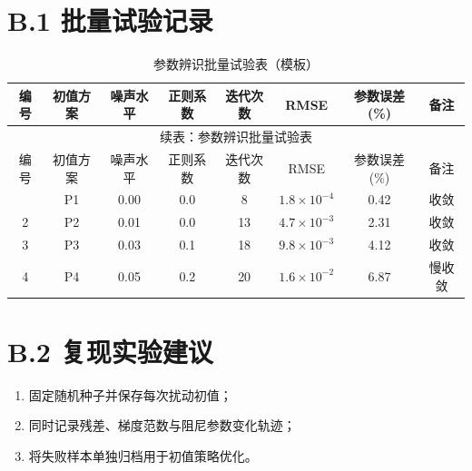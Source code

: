 \section*{B.1 批量试验记录}
{
\footnotesize
\renewcommand{\arraystretch}{1.2}
\begin{longtable}{cccccccc}
\caption{参数辨识批量试验表（模板）}\\
\toprule
编号 & 初值方案 & 噪声水平 & 正则系数 & 迭代次数 & RMSE & 参数误差(\%) & 备注 \\
\midrule
\endfirsthead
\multicolumn{8}{c}{续表：参数辨识批量试验表}\\
\toprule
编号 & 初值方案 & 噪声水平 & 正则系数 & 迭代次数 & RMSE & 参数误差(\%) & 备注 \\
\midrule
\endhead
\bottomrule
\endfoot
1 & P1 & 0.00 & 0.0 & 8 & $1.8\times10^{-4}$ & 0.42 & 收敛 \\
2 & P2 & 0.01 & 0.0 & 13 & $4.7\times10^{-3}$ & 2.31 & 收敛 \\
3 & P3 & 0.03 & 0.1 & 18 & $9.8\times10^{-3}$ & 4.12 & 收敛 \\
4 & P4 & 0.05 & 0.2 & 20 & $1.6\times10^{-2}$ & 6.87 & 慢收敛 \\
\end{longtable}
}

\section*{B.2 复现实验建议}
\begin{enumerate}
  \item 固定随机种子并保存每次扰动初值；
  \item 同时记录残差、梯度范数与阻尼参数变化轨迹；
  \item 将失败样本单独归档用于初值策略优化。
\end{enumerate}
